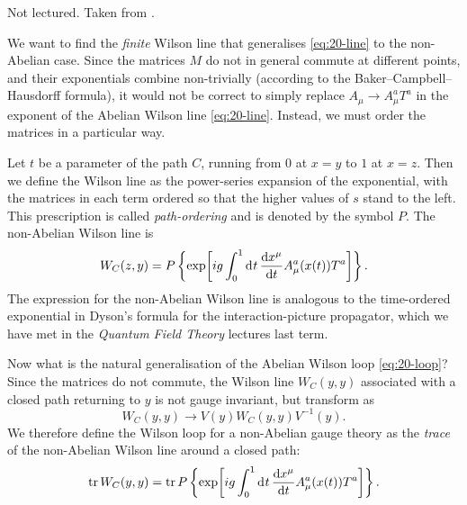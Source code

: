 \begin{leftbar}
  Not lectured. Taken from \cite[Chapter 15.3]{peskin}.
\end{leftbar}
We want to find the \emph{finite} Wilson line that generalises \eqref{eq:20-line} to the non-Abelian case.
Since the matrices $M$ do not in general commute at different points, and their exponentials combine non-trivially (according to the Baker--Campbell--Hausdorff formula), it would not be correct to simply replace $A_{\mu} \to A_{\mu}^{a} T^{a}$ in the exponent of the Abelian Wilson line \eqref{eq:20-line}.
Instead, we must order the matrices in a particular way.

Let $t$ be a parameter of the path $C$, running from $0$ at $x = y$ to $1$ at $x = z$.
Then we define the Wilson line as the power-series expansion of the exponential, with the matrices in each term ordered so that the higher values of $s$ stand to the left. This prescription is called \emph{path-ordering} and is denoted by the symbol $P$.
The non-Abelian Wilson line is
\begin{equation}
  W_C(z, y) = P \left\{ \exp[i g \int_0^1 \dd[]{t} \dv{x^{\mu}}{t} A^{a}_{\mu}(x(t)) T^{a}] \right\}.
\end{equation}
The expression for the non-Abelian Wilson line is analogous to the time-ordered exponential in Dyson's formula for the interaction-picture propagator, which we have met in the \emph{Quantum Field Theory} lectures last term.

Now what is the natural generalisation of the Abelian Wilson loop \eqref{eq:20-loop}?
Since the matrices do not commute, the Wilson line $W_C(y, y)$ associated with a closed path returning to $y$ is not gauge invariant, but transform as
\begin{equation}
  \label{eq:21-wnonabtrans}
  W_C(y, y) \to V(y) W_C(y, y) V^{-1}(y).
\end{equation}
We therefore define the Wilson loop for a non-Abelian gauge theory as the \emph{trace} of the non-Abelian Wilson line around a closed path:
\begin{equation}
  \tr W_C(y, y) = \tr P \left\{ \exp[i g \int_0^1 \dd[]{t} \dv{x^{\mu}}{t} A^{a}_{\mu}(x(t)) T^{a}] \right\}.
\end{equation}

